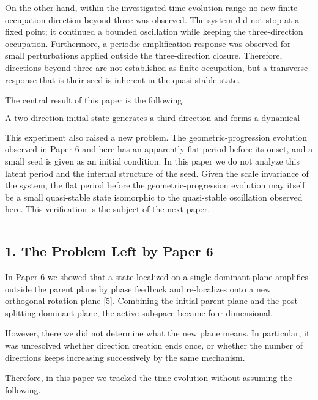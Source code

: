 \documentclass[
  a4paper,
]{article}
\begin{document}
On the other hand, within the investigated time-evolution range no new
finite-occupation direction beyond three was observed. The system did
not stop at a fixed point; it continued a bounded oscillation while
keeping the three-direction occupation. Furthermore, a periodic
amplification response was observed for small perturbations applied
outside the three-direction closure. Therefore, directions beyond three
are not established as finite occupation, but a transverse response that
is their seed is inherent in the quasi-stable state.

The central result of this paper is the following.

\[
\boxed{
\text{A two-direction initial state generates a third direction and forms a dynamical quasi-stable closure consisting of a three-direction space.}
}
\]

This experiment also raised a new problem. The geometric-progression
evolution observed in Paper 6 and here has an apparently flat period
before its onset, and a small seed is given as an initial condition. In
this paper we do not analyze this latent period and the internal
structure of the seed. Given the scale invariance of the system, the
flat period before the geometric-progression evolution may itself be a
small quasi-stable state isomorphic to the quasi-stable oscillation
observed here. This verification is the subject of the next paper.

\begin{center}\rule{0.5\linewidth}{0.5pt}\end{center}

\subsection{1. The Problem Left by Paper
6}\label{the-problem-left-by-paper-6}

In Paper 6 we showed that a state localized on a single dominant plane
amplifies outside the parent plane by phase feedback and re-localizes
onto a new orthogonal rotation plane {[}5{]}. Combining the initial
parent plane and the post-splitting dominant plane, the active subspace
became four-dimensional.

However, there we did not determine what the new plane means. In
particular, it was unresolved whether direction creation ends once, or
whether the number of directions keeps increasing successively by the
same mechanism.

Therefore, in this paper we tracked the time evolution without assuming
the following.
\end{document}
